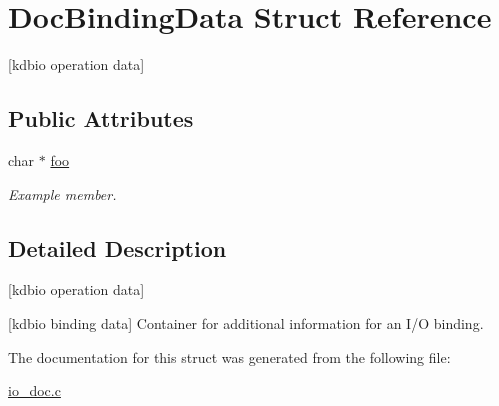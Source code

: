 \hypertarget{structDocBindingData}{}\section{Doc\+Binding\+Data Struct Reference}
\label{structDocBindingData}


\mbox{[}kdbio operation data\mbox{]}  


\subsection*{Public Attributes}
\begin{DoxyCompactItemize}
\item 
\mbox{\label{structDocBindingData_ad3a3b6278b9d7287f923de0e6c3fa14d}} 
char $\ast$ \hyperlink{structDocBindingData_ad3a3b6278b9d7287f923de0e6c3fa14d}{foo}
\begin{DoxyCompactList}\small\item\em Example member. \end{DoxyCompactList}\end{DoxyCompactItemize}


\subsection{Detailed Description}
\mbox{[}kdbio operation data\mbox{]} 

\mbox{[}kdbio binding data\mbox{]} Container for additional information for an I/O binding. 

The documentation for this struct was generated from the following file\+:\begin{DoxyCompactItemize}
\item 
\hyperlink{io__doc_8c}{io\+\_\+doc.\+c}\end{DoxyCompactItemize}
